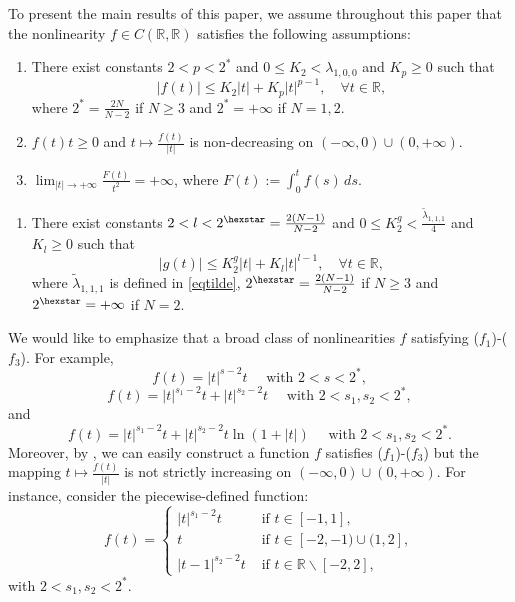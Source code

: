 \documentclass[11pt]{amsart}
\newcommand{\abs}[1]{\lvert#1\rvert}
\newcommand{\red}[1]{\textcolor{red}{#1}}
\newcommand{\R}{\mathbb{R}}
\numberwithin{equation}{section}
\begin{document}
To present the main results of this paper, we assume throughout this paper that the nonlinearity $f \in  C(\R, \R)$ satisfies the following assumptions:
\begin{enumerate}[align=left,labelsep=0pt]
    \item[($f_1$)] There exist constants $2<p<2^*$ and $0\leq K_2<\lambda_{1,0,0}$ and $K_{p} \geq 0$ such that
    $$
    \abs{f(t)} \leq K_2\abs{t} + K_{p}\abs{t}^{p-1}, \quad \forall t \in \mathbb{R},
    $$
    where $2^* = \frac{2N}{N-2}$ if $N \geq 3$ and $2^* = +\infty$ if $N = 1, 2$.
    \item[($f_2$)]  $f(t)t\geq 0$ and $t\mapsto \frac{f(t)}{\abs{t}}$ is non-decreasing on $(-\infty,0)\cup(0,+\infty)$.

    \item[($f_3$)] $\displaystyle \lim_{\abs{t}\to +\infty}\frac{F(t)}{t^2}=+\infty$, where $F(t):=\int_0^tf(s)\,ds$.
\end{enumerate}
\begin{enumerate}[align=left,labelsep=0pt]
	\item[($g_1$)] There exist constants $2<l<2^{\hexstar}=\frac{2(N-1)}{N-2}$ and  $0\leq K_2^g<\frac{\tilde{\lambda}_{1,1,1}}{4}$ and $K_{l} \geq 0$ such that
	$$
	\abs{g(t)} \leq K_2^g\abs{t} + K_{l}\abs{t}^{l-1}, \quad \forall t \in \mathbb{R},
	$$
	where $\tilde{\lambda}_{1,1,1}$ is defined in \eqref{eqtilde}, $2^{\hexstar} = \frac{2(N-1)}{N-2}$ if $N \geq 3$ and $2^{\hexstar} = +\infty$ if $N =2$.
	
\end{enumerate}
We would like to  emphasize that a broad class of nonlinearities  $f$ satisfying ($f_1$)-($f_3$).  For example,
$$f(t)=\abs{t}^{s-2}t\quad  \text{ with } 2<s<2^*,$$
$$f(t)=\abs{t}^{s_1-2}t + \abs{t}^{s_2-2}t\quad  \text{ with } 2<s_1,s_2<2^*,$$
and
$$f(t)=\abs{t}^{s_1-2}t + \abs{t}^{s_2-2}t\ln(1+\abs{t})\quad  \text{ with } 2<s_1,s_2<2^*.$$
Moreover, by \cite[Remark 1.1]{Zhong}, we can easily construct a function $f$ satisfies ($f_1$)-($f_3$) but the mapping $t\mapsto \frac{f(t)}{\abs{t}}$ is not strictly increasing on $(-\infty,0)\cup(0,+\infty)$. For instance, consider the piecewise-defined function:
$$
f(t)=
\begin{cases}
    \abs{t}^{s_1-2}t &\text{ if } t\in [-1,1],\\
    t &\text{ if } t\in [-2,-1)\cup(1,2],\\
    \abs{t-1}^{s_2-2}t &\text{ if } t\in \R \backslash[-2,2],
\end{cases}
$$
with $2<s_1,s_2<2^*$.
\end{document}
